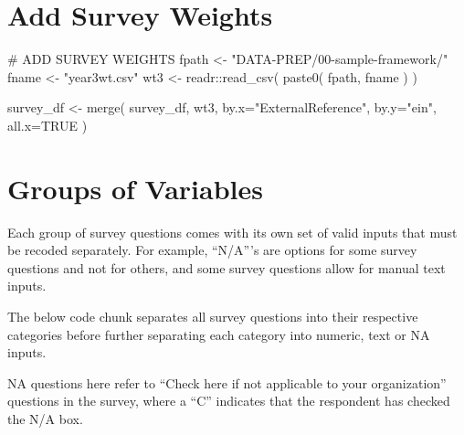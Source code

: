 \documentclass[
  letterpaper,
]{scrbook}
\newenvironment{Shaded}{\begin{snugshade}}{\end{snugshade}}
\newcommand{\AttributeTok}[1]{\textcolor[rgb]{0.40,0.45,0.13}{#1}}
\newcommand{\CommentTok}[1]{\textcolor[rgb]{0.37,0.37,0.37}{#1}}
\newcommand{\ConstantTok}[1]{\textcolor[rgb]{0.56,0.35,0.01}{#1}}
\newcommand{\FunctionTok}[1]{\textcolor[rgb]{0.28,0.35,0.67}{#1}}
\newcommand{\NormalTok}[1]{\textcolor[rgb]{0.00,0.23,0.31}{#1}}
\newcommand{\OtherTok}[1]{\textcolor[rgb]{0.00,0.23,0.31}{#1}}
\newcommand{\SpecialCharTok}[1]{\textcolor[rgb]{0.37,0.37,0.37}{#1}}
\newcommand{\StringTok}[1]{\textcolor[rgb]{0.13,0.47,0.30}{#1}}
\begin{document}
\part{Add Survey Weights}

\begin{Shaded}
\begin{Highlighting}[]
\CommentTok{\# ADD SURVEY WEIGHTS }
\NormalTok{fpath }\OtherTok{\textless{}{-}} \StringTok{"DATA{-}PREP/00{-}sample{-}framework/"}
\NormalTok{fname }\OtherTok{\textless{}{-}} \StringTok{"year3wt.csv"}
\NormalTok{wt3  }\OtherTok{\textless{}{-}}\NormalTok{ readr}\SpecialCharTok{::}\FunctionTok{read\_csv}\NormalTok{( }\FunctionTok{paste0}\NormalTok{( fpath, fname ) )}

\NormalTok{survey\_df }\OtherTok{\textless{}{-}} \FunctionTok{merge}\NormalTok{( survey\_df, wt3, }\AttributeTok{by.x=}\StringTok{"ExternalReference"}\NormalTok{, }\AttributeTok{by.y=}\StringTok{"ein"}\NormalTok{, }\AttributeTok{all.x=}\ConstantTok{TRUE}\NormalTok{ )}
\end{Highlighting}
\end{Shaded}

\part{Groups of Variables}

Each group of survey questions comes with its own set of valid inputs
that must be recoded separately. For example, ``N/A'''s are options for
some survey questions and not for others, and some survey questions
allow for manual text inputs.

The below code chunk separates all survey questions into their
respective categories before further separating each category into
numeric, text or NA inputs.

NA questions here refer to ``Check here if not applicable to your
organization'' questions in the survey, where a ``C'' indicates that the
respondent has checked the N/A box.
\end{document}
